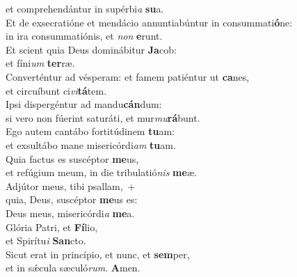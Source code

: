 \oddverse et comprehendántur in supérbi\textit{a} \textbf{su}a.\\
\evenverse Et de exsecratióne et mendácio annuntiabúntur in consummati\textbf{ó}ne:~\*\\
\evenverse in ira consummatiónis, et \textit{non} \textbf{e}runt.\\
\oddverse Et scient quia Deus dominábitur \textbf{Ja}cob:~\*\\
\oddverse et fíni\textit{um} \textbf{ter}ræ.\\
\evenverse Converténtur ad vésperam: et famem patiéntur ut \textbf{ca}nes,~\*\\
\evenverse et circuíbunt ci\textit{vi}\textbf{tá}tem.\\
\oddverse Ipsi dispergéntur ad mandu\textbf{cán}dum:~\*\\
\oddverse si vero non fúerint saturáti, et mur\textit{mu}\textbf{rá}bunt.\\
\evenverse Ego autem cantábo fortitúdinem \textbf{tu}am:~\*\\
\evenverse et exsultábo mane misericórdi\textit{am} \textbf{tu}am.\\
\oddverse Quia factus es suscéptor \textbf{me}us,~\*\\
\oddverse et refúgium meum, in die tribulatió\textit{nis} \textbf{me}æ.\\
\evenverse Adjútor meus, tibi psallam,~+\\
\evenverse  quia, Deus, suscéptor \textbf{me}us es:~\*\\
\evenverse Deus meus, misericórdi\textit{a} \textbf{me}a.\\
\oddverse Glória Patri, et \textbf{Fí}lio,~\*\\
\oddverse et Spirítu\textit{i} \textbf{San}cto.\\
\evenverse Sicut erat in princípio, et nunc, et \textbf{sem}per,~\*\\
\evenverse et in sǽcula sæculó\textit{rum}. \textbf{A}men.\\
